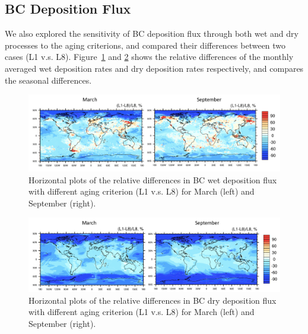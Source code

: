 \documentclass[12pt, fullpage]{uiucthesis2009}
\begin{document}
	\subsection{BC Deposition Flux}
	We also explored the sensitivity of BC deposition flux through both wet and dry processes to the aging criterions, and compared their differences between two cases (L1 v.s. L8). Figure~\ref{fig_P17} and \ref{fig_P18} shows the relative differences of the monthly averaged wet deposition rates and dry deposition rates respectively, and compares the seasonal differences. 
	
	\begin{figure}[h] 
		\begin{center}
			\includegraphics[width = 1\textwidth]{Figure17}
			\caption[Horizontal plots of the relative differences in BC wet deposition flux with different aging criterion (L1 v.s. L8) for March (left) and September (right).]{\label{fig_P17} Horizontal plots of the relative differences in BC wet deposition flux with different aging criterion (L1 v.s. L8) for March (left) and September (right).}
		\end{center}
	\end{figure}
	
	
	\begin{figure}[h] 
		\begin{center}
			\includegraphics[width = 1\textwidth]{Figure18}
			\caption[Horizontal plots of the relative differences in BC dry deposition flux with different aging criterion (L1 v.s. L8) for March (left) and September (right)]{\label{fig_P18} Horizontal plots of the relative differences in BC dry deposition flux with different aging criterion (L1 v.s. L8) for March (left) and September (right).}
		\end{center}
	\end{figure}
	
\end{document}
